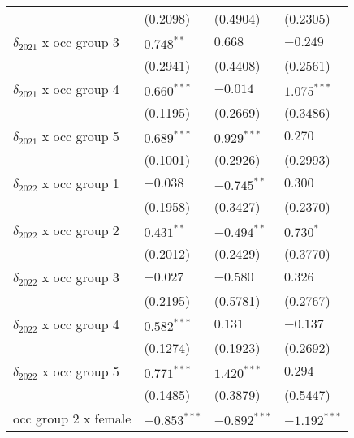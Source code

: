 \begin{tabular}{llll}
                                       &           (0.2098) &           (0.4904) &           (0.2305) \\
$\delta_{2021}$ x occ group 3          &       $0.748^{**}$ &            $0.668$ &           $-0.249$ \\
                                       &           (0.2941) &           (0.4408) &           (0.2561) \\
$\delta_{2021}$ x occ group 4          &      $0.660^{***}$ &           $-0.014$ &      $1.075^{***}$ \\
                                       &           (0.1195) &           (0.2669) &           (0.3486) \\
$\delta_{2021}$ x occ group 5          &      $0.689^{***}$ &      $0.929^{***}$ &            $0.270$ \\
                                       &           (0.1001) &           (0.2926) &           (0.2993) \\
$\delta_{2022}$ x occ group 1          &           $-0.038$ &      $-0.745^{**}$ &            $0.300$ \\
                                       &           (0.1958) &           (0.3427) &           (0.2370) \\
$\delta_{2022}$ x occ group 2          &       $0.431^{**}$ &      $-0.494^{**}$ &          $0.730^*$ \\
                                       &           (0.2012) &           (0.2429) &           (0.3770) \\
$\delta_{2022}$ x occ group 3          &           $-0.027$ &           $-0.580$ &            $0.326$ \\
                                       &           (0.2195) &           (0.5781) &           (0.2767) \\
$\delta_{2022}$ x occ group 4          &      $0.582^{***}$ &            $0.131$ &           $-0.137$ \\
                                       &           (0.1274) &           (0.1923) &           (0.2692) \\
$\delta_{2022}$ x occ group 5          &      $0.771^{***}$ &      $1.420^{***}$ &            $0.294$ \\
                                       &           (0.1485) &           (0.3879) &           (0.5447) \\
occ group 2 x female                   &     $-0.853^{***}$ &     $-0.892^{***}$ &     $-1.192^{***}$ \\

\end{tabular}
